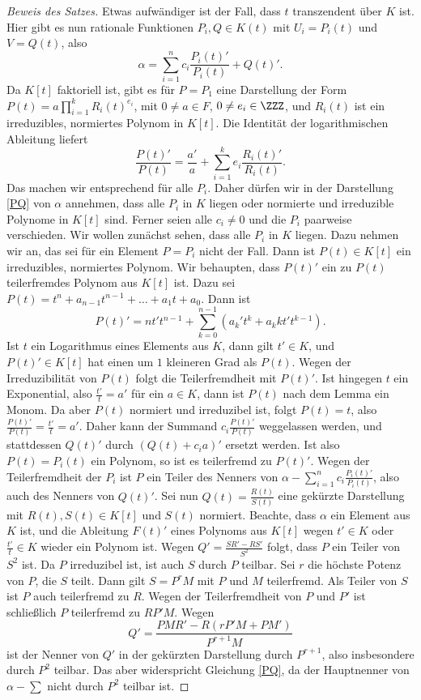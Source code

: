 \documentclass[12pt,a4paper,twoside]{article}
\begin{document}
\begin{proof}[Beweis des Satzes]
Etwas aufw\"andiger ist der Fall, dass $t$ transzendent \"uber $K$ ist. Hier
gibt es nun rationale Funktionen $P_i,Q\in K(t)$ mit $U_i=P_i(t)$ und
$V=Q(t)$, also
\begin{equation}\label{PQ}
\alpha=\sum_{i=1}^nc_i\frac{P_i(t)'}{P_i(t)}+Q(t)'.
\end{equation}
Da $K[t]$ faktoriell ist, gibt es f\"ur $P=P_1$ eine Darstellung der Form
$P(t)=a\prod_{i=1}^kR_i(t)^{e_i}$, mit $0\ne a\in F$, $0\ne e_i\in\ZZZ$, und
$R_i(t)$ ist ein irreduzibles, normiertes Polynom in $K[t]$. Die Identit\"at
der logarithmischen Ableitung liefert
\[
\frac{P(t)'}{P(t)}=\frac{a'}{a}+\sum_{i=1}^k e_i\frac{R_i(t)'}{R_i(t)}.
\]
Das machen wir entsprechend f\"ur alle $P_i$. Daher d\"urfen wir in
der Darstellung \eqref{PQ} von $\alpha$ annehmen, dass alle $P_i$ in
$K$ liegen oder normierte und irreduzible Polynome in $K[t]$ sind. Ferner
seien alle $c_i\ne0$ und die $P_i$ paarweise verschieden. Wir wollen
zun\"achst sehen, dass alle $P_i$ in $K$ liegen. Dazu nehmen wir an, das sei
f\"ur ein Element $P=P_i$ nicht der Fall. Dann ist $P(t)\in K[t]$ ein
irreduzibles, normiertes Polynom. Wir behaupten, dass $P(t)'$ ein zu $P(t)$
teilerfremdes Polynom aus $K[t]$ ist. Dazu sei
$P(t)=t^n+a_{n-1}t^{n-1}+\dots+a_1t+a_0$. Dann ist
\[
P(t)'=nt't^{n-1}+\sum_{k=0}^{n-1}(a_k't^k+a_kkt't^{k-1}).
\]
Ist $t$ ein Logarithmus eines Elements aus $K$, dann gilt $t'\in K$, und
$P(t)'\in K[t]$ hat einen um $1$ kleineren Grad als $P(t)$. Wegen der
Irreduzibilit\"at von $P(t)$ folgt die Teilerfremdheit mit $P(t)'$. Ist
hingegen $t$ ein Exponential, also $\frac{t'}{t}=a'$ f\"ur ein $a\in K$, dann
ist $P(t)$ nach dem Lemma ein Monom. Da aber $P(t)$ normiert und irreduzibel
ist, folgt $P(t)=t$, also $\frac{P(t)'}{P(t)}=\frac{t'}{t}=a'$. Daher kann der
Summand $c_i\frac{P(t)'}{P(t)}$ weggelassen werden, und stattdessen $Q(t)'$
durch $(Q(t)+c_ia)'$ ersetzt werden. Ist also $P(t)=P_i(t)$ ein Polynom, so
ist es teilerfremd zu $P(t)'$. Wegen der Teilerfremdheit der $P_i$ ist $P$ ein
Teiler des Nenners von $\alpha-\sum_{i=1}^nc_i\frac{P_i(t)'}{P_i(t)}$, also
auch des Nenners von $Q(t)'$. Sei nun $Q(t)=\frac{R(t)}{S(t)}$ eine gek\"urzte
Darstellung mit $R(t),S(t)\in K[t]$ und $S(t)$ normiert. Beachte, dass
$\alpha$ ein Element aus $K$ ist, und die Ableitung $F(t)'$ eines Polynoms aus
$K[t]$ wegen $t'\in K$ oder $\frac{t'}{t}\in K$ wieder ein Polynom ist. Wegen
$Q'=\frac{SR'-RS'}{S^2}$ folgt, dass $P$ ein Teiler von $S^2$ ist. Da $P$
irreduzibel ist, ist auch $S$ durch $P$ teilbar. Sei $r$ die h\"ochste Potenz
von $P$, die $S$ teilt. Dann gilt $S=P^rM$ mit $P$ und $M$ teilerfremd. Als
Teiler von $S$ ist $P$ auch teilerfremd zu $R$. Wegen der Teilerfremdheit von
$P$ und $P'$ ist schlie\ss lich $P$ teilerfremd zu $RP'M$.  Wegen
\[
Q'=\frac{PMR'-R(rP'M+PM')}{P^{r+1}M}
\]
ist der Nenner von $Q'$ in der gek\"urzten Darstellung durch $P^{r+1}$, also
insbesondere durch $P^2$ teilbar. Das aber widerspricht Gleichung \eqref{PQ},
da der Hauptnenner von $\alpha-\sum$ nicht durch $P^2$ teilbar ist.


\end{proof}
\end{document}
